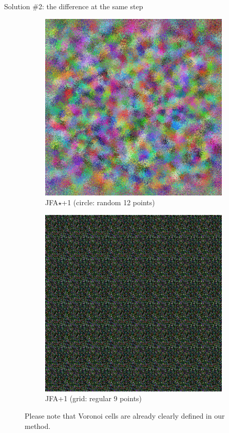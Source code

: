 \documentclass[aspectratio=169, 22pt]{beamer}
\begin{document}
\begin{frame}{Solution \#2: the difference at the same step}

\begin{figure}
\centering
\begin{subfigure}{.5\textwidth}
  \centering
  \includegraphics[width=0.75\linewidth]{./solution_2a.png}
	\caption{JFA$\star$+1 (circle: random 12 points)}
  \label{fig:sub1}
\end{subfigure}%
\begin{subfigure}{.5\textwidth}
  \centering
  \includegraphics[width=0.75\linewidth]{./solution_2b.png}
	\caption{JFA+1 (grid: regular 9 points)}
  \label{fig:sub2}
\end{subfigure}
	\caption{Please note that Voronoi cells are already clearly defined in our
	method.}
\label{fig:test}
\end{figure}

\end{frame}
\end{document}
